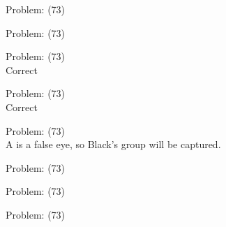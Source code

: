 \documentclass[11pt]{article}
\begin{document}
\begin{minipage}[t]{0.5\textwidth}
  {\centering
  
Problem: (73)\\
  }
\end{minipage}
\begin{minipage}[t]{0.5\textwidth}
  {\centering
  
Problem: (73)\\
  }
\end{minipage}
\begin{minipage}[t]{0.5\textwidth}
  {\centering
  
Problem: (73)\\
Correct\\
  }
\end{minipage}
\begin{minipage}[t]{0.5\textwidth}
  {\centering
  
Problem: (73)\\
Correct\\
  }
\end{minipage}
\begin{minipage}[t]{0.5\textwidth}
  {\centering
  
Problem: (73)\\
A is a false eye, so Black's group will be captured.\\
  }
\end{minipage}
\begin{minipage}[t]{0.5\textwidth}
  {\centering
  
Problem: (73)\\
  }
\end{minipage}
\begin{minipage}[t]{0.5\textwidth}
  {\centering
  
Problem: (73)\\
  }
\end{minipage}
\begin{minipage}[t]{0.5\textwidth}
  {\centering
  
Problem: (73)\\
  }
\end{minipage}
\end{document}
